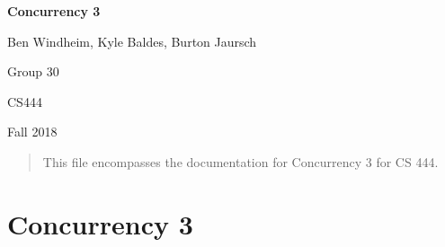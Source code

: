 \documentclass[onecolumn, draftclsnofoot,10pt, compsoc]{IEEEtran}
\def \GroupNumber{30}
\def \GroupMembers{Ben Windheim, Kyle Baldes, Burton Jaursch}
\def \ProjectName{Concurrency 3}
\begin{document}
\begin{singlespace}
\begin{titlepage}
        \hfill
        \par\vspace{.2in}
        \centering
        \scshape{
            \textbf{\Huge\ProjectName}\par
            \vspace{.5in}
            {\Large
                \GroupMembers\par
                Group \GroupNumber\par
            }
            \large CS444 \par
            \large Fall 2018\par


            \vfill
            }
            \begin{abstract}
                This file encompasses the documentation for Concurrency 3 for CS 444.

            \end{abstract}






\end{titlepage}

\section*{Concurrency 3}


\end{singlespace}
\end{document}
